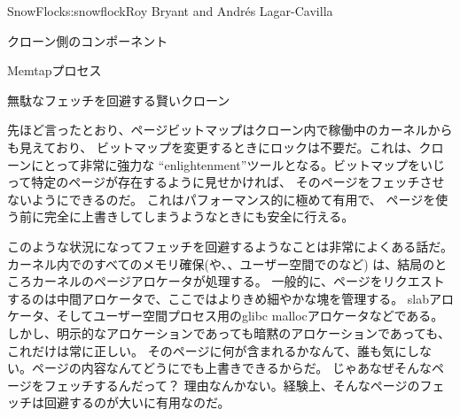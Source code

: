 \begin{aosachapter}{SnowFlock}{s:snowflock}{Roy Bryant and Andr\'e{s} Lagar-Cavilla}
\begin{aosasect1}{クローン側のコンポーネント}
\begin{aosasect2}{Memtapプロセス}
\end{aosasect2}

\begin{aosasect2}{無駄なフェッチを回避する賢いクローン}

先ほど言ったとおり、ページビットマップはクローン内で稼働中のカーネルからも見えており、
ビットマップを変更するときにロックは不要だ。これは、クローンにとって非常に強力な
``enlightenment''ツールとなる。ビットマップをいじって特定のページが存在するように見せかければ、
そのページをフェッチさせないようにできるのだ。
これはパフォーマンス的に極めて有用で、
ページを使う前に完全に上書きしてしまうようなときにも安全に行える。

このような状況になってフェッチを回避するようなことは非常によくある話だ。
カーネル内でのすべてのメモリ確保(や、、ユーザー空間でのなど)
は、結局のところカーネルのページアロケータが処理する。
一般的に、ページをリクエストするのは中間アロケータで、ここではよりきめ細やかな塊を管理する。
slabアロケータ、そしてユーザー空間プロセス用のglibc mallocアロケータなどである。
しかし、明示的なアロケーションであっても暗黙のアロケーションであっても、これだけは常に正しい。
そのページに何が含まれるかなんて、誰も気にしない。ページの内容なんてどうにでも上書きできるからだ。
じゃあなぜそんなページをフェッチするんだって？
理由なんかない。経験上、そんなページのフェッチは回避するのが大いに有用なのだ。


\end{aosasect2}
\end{aosasect1}
\end{aosachapter}
